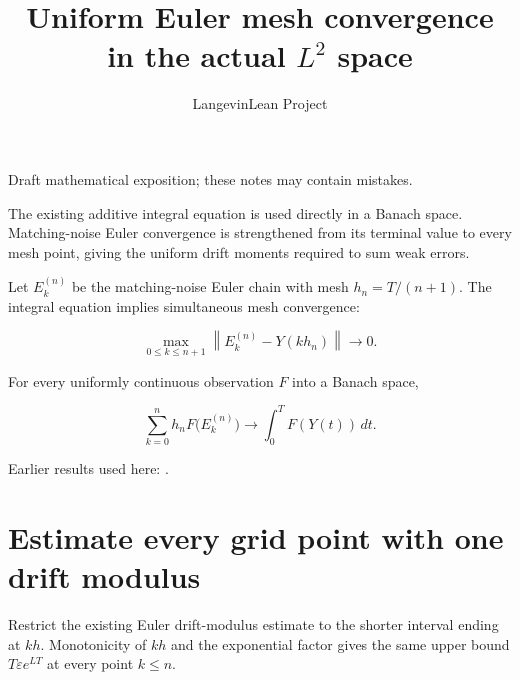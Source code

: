 \documentclass[11pt,a4paper]{article}
\title{\texorpdfstring{Uniform Euler mesh convergence in the actual \(L^{2}\) space}{Uniform Euler mesh convergence in the actual L² space}}
\author{LangevinLean Project}
\date{}
\begin{document}
\maketitle
Draft mathematical exposition; these notes may contain mistakes.


The existing additive integral equation is used directly in a Banach space. Matching-noise Euler convergence is strengthened from its terminal value to every mesh point, giving the uniform drift moments required to sum weak errors.



Let \(E_k^{(n)}\) be the matching-noise Euler chain with mesh \(h_n=T/(n+1)\). The integral equation implies simultaneous mesh convergence:


\[\max_{0\le k\le n+1}\left\|E_k^{(n)}-Y(kh_n)\right\|
\longrightarrow0.\]


For every uniformly continuous observation \(F\) into a Banach space,


\[\sum_{k=0}^{n}h_nF\bigl(E_k^{(n)}\bigr)
\longrightarrow\int_0^T F(Y(t))\,dt.\]

Earlier results used here: \cite[Section~3.16]{LangevinLean2026ULASC}.

\section{\texorpdfstring{Estimate every grid point with one drift modulus}{Estimate every grid point with one drift modulus}}


Restrict the existing Euler drift-modulus estimate to the shorter interval ending at \(kh\). Monotonicity of \(kh\) and the exponential factor gives the same upper bound \(T\varepsilon e^{LT}\) at every point \(k\le n\).
\end{document}
